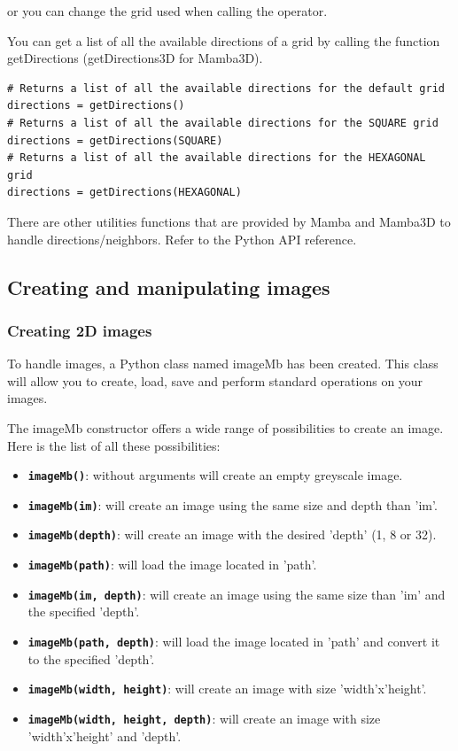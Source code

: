 \documentclass[a4paper,10pt,oneside]{article}
\begin{document}
or you can change the grid used when calling the operator.

You can get a list of all the available directions of a grid
by calling the function getDirections (getDirections3D for Mamba3D).

\lstset{language=Python}
\begin{lstlisting}
# Returns a list of all the available directions for the default grid
directions = getDirections()
# Returns a list of all the available directions for the SQUARE grid
directions = getDirections(SQUARE)
# Returns a list of all the available directions for the HEXAGONAL grid
directions = getDirections(HEXAGONAL)
\end{lstlisting}

There are other utilities functions that are provided by Mamba and Mamba3D to
handle  directions/neighbors. Refer to the Python API reference.

\subsection{Creating and manipulating images}
\label{cha:create_im}

\subsubsection{Creating 2D images}

To handle images, a Python class named imageMb has been created. This class will allow
you to create, load, save and perform standard operations on your images.

The imageMb constructor offers a wide range of possibilities to create an image. 
Here is the list of all these possibilities:

\begin{itemize}
\item \texttt{\textbf{imageMb()}}: without arguments will create an empty 
greyscale image.
\item \texttt{\textbf{imageMb(im)}}: will create an image using the same size 
and depth than 'im'.
\item \texttt{\textbf{imageMb(depth)}}: will create an image with the desired
'depth' (1, 8 or 32).
\item \texttt{\textbf{imageMb(path)}}: will load the image located in 'path'.
\item \texttt{\textbf{imageMb(im, depth)}}: will create an image using the same 
size than 'im' and the specified 'depth'.
\item \texttt{\textbf{imageMb(path, depth)}}: will load the image located in 
'path' and convert it to the specified 'depth'.
\item \texttt{\textbf{imageMb(width, height)}}: will create an image with size 
'width'x'height'.
\item \texttt{\textbf{imageMb(width, height, depth)}}: will create an image with
size 'width'x'height' and 'depth'.
\end{itemize}
\end{document}
